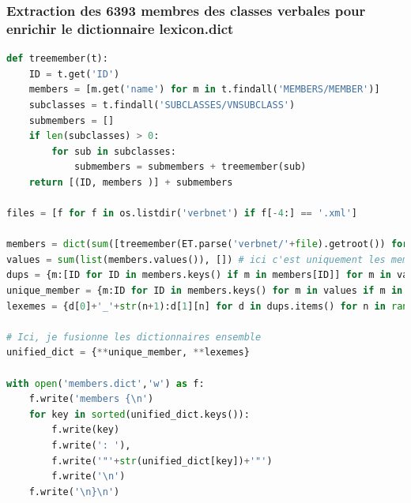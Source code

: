 

\subsubsection{Extraction des 6393 membres des classes verbales pour enrichir le dictionnaire lexicon.dict}

\begin{lstlisting}[language=Python, caption = code pour ajouter des lexèmes à lexicon.dict]
def treemember(t):
    ID = t.get('ID')
    members = [m.get('name') for m in t.findall('MEMBERS/MEMBER')]
    subclasses = t.findall('SUBCLASSES/VNSUBCLASS')
    submembers = []
    if len(subclasses) > 0:
        for sub in subclasses:
            submembers = submembers + treemember(sub)
    return [(ID, members )] + submembers

files = [f for f in os.listdir('verbnet') if f[-4:] == '.xml']

members = dict(sum([treemember(ET.parse('verbnet/'+file).getroot()) for file in files], [])) # ici on a classe: [membre,...]
values = sum(list(members.values()), []) # ici c'est uniquement les membres, sans infos sur leur classe
dups = {m:[ID for ID in members.keys() if m in members[ID]] for m in values if values.count(m)>1}
unique_member = {m:ID for ID in members.keys() for m in values if m in members[ID] and values.count(m)==1}
lexemes = {d[0]+'_'+str(n+1):d[1][n] for d in dups.items() for n in range(len(d[1]))}

# Ici, je fusionne les dictionnaires ensemble
unified_dict = {**unique_member, **lexemes}

with open('members.dict','w') as f:
    f.write('members {\n')
    for key in sorted(unified_dict.keys()):
        f.write(key)
        f.write(': '),
        f.write('"'+str(unified_dict[key])+'"')
        f.write('\n')
    f.write('\n}\n')

\end{lstlisting}

